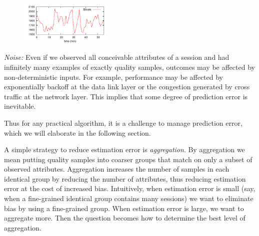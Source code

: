 \begin{packedenumerate}
\begin{figure}[h!]
\centering
 \includegraphics[width=0.4\textwidth] {figures/quality-time.pdf}
\label{fig:quality-variability}
\end{figure}

  \item \emph{Noise:} Even if we observed all conceivable attributes of a session and had infinitely many examples of exactly quality samples, outcomes may be affected by non-deterministic inputs.  For example, performance may be affected by exponentially backoff at the data link layer or the congestion generated by cross traffic at the network layer. This implies that some degree of prediction error is inevitable.
\end{packedenumerate}


Thus for any practical algorithm, it is a challenge to manage prediction error, which we will elaborate in the following section.

\label{subsec:aggregation}
A simple strategy to reduce estimation error is {\it aggregation}.  By aggregation we mean putting quality samples into coarser groups that match on only a subset of observed attributes.  Aggregation increases the number of samples in each identical group by reducing the number of attributes, thus reducing estimation error at the cost of increased bias. 
Intuitively, when estimation error is small (say, when a fine-grained identical group contains many sessions) we want to eliminate bias by using a fine-grained group.  When estimation error is large, we want to aggregate more. 
Then the question becomes how to determine the best level of aggregation.


